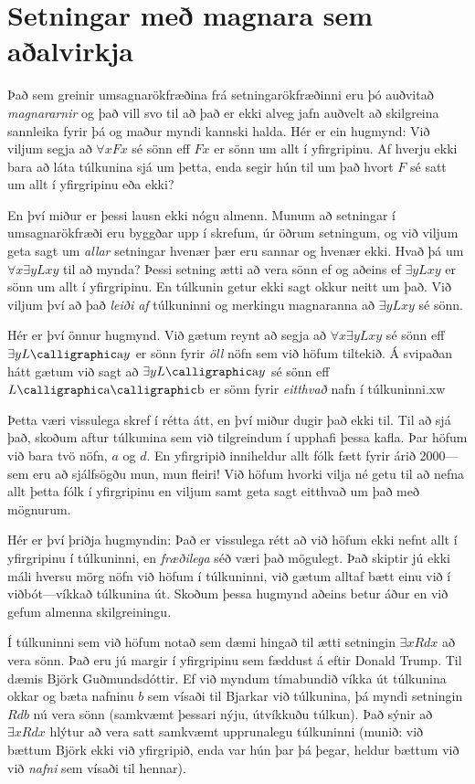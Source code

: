\section{Setningar með magnara sem aðalvirkja}\label{s:MainLogicalOperatorQuantifier}

Það sem greinir umsagnarökfræðina frá setningarökfræðinni eru þó auðvitað \emph{magnararnir} og það vill svo til að það er ekki alveg jafn auðvelt að skilgreina sannleika fyrir þá og maður myndi kannski halda. Hér er ein hugmynd: Við viljum segja að $\forall x Fx$ sé sönn eff $Fx$ er sönn um allt í yfirgripinu. Af hverju ekki bara að láta túlkunina sjá um þetta, enda segir hún til um það hvort $F$ sé satt um allt í yfirgripinu eða ekki?

En því miður er þessi lausn ekki nógu almenn. Munum að setningar í umsagnarökfræði eru byggðar upp í skrefum, úr öðrum setningum, og við viljum geta sagt um \emph{allar} setningar hvenær þær eru sannar og hvenær ekki. Hvað þá um $\forall x \exists y Lxy$ til að mynda? Þessi setning ætti að vera sönn ef og aðeins ef $\exists y Lxy$ er sönn um allt í yfirgripinu. En túlkunin getur ekki sagt okkur neitt um það. Við viljum því að það \emph{leiði af} túlkuninni og merkingu magnaranna að $\exists y Lxy$ sé sönn.

Hér er því önnur hugmynd. Við gætum reynt að segja að $\forall x \exists y Lxy$ sé sönn eff $\exists y L\meta{a}y$ er sönn fyrir \emph{öll} nöfn  sem við höfum tiltekið. Á svipaðan hátt gætum við sagt að $\exists y L\meta{a}y$ sé sönn eff $L\meta{a}\meta{b}$ er sönn fyrir \emph{eitthvað} nafn  í túlkuninni.xw

Þetta væri vissulega skref í rétta átt, en því miður dugir það ekki til. Til að sjá það, skoðum aftur túlkunina sem við tilgreindum í upphafi þessa kafla. Þar höfum við bara tvö nöfn, $a$ og $d$. En yfirgripið inniheldur allt fólk fætt fyrir árið 2000---sem eru að sjálfsögðu mun, mun fleiri! Við höfum hvorki vilja né getu til að nefna allt þetta fólk í yfirgripinu en viljum samt geta sagt eitthvað um það með mögnurum.

Hér er því þriðja hugmyndin: Það er vissulega rétt að við höfum ekki nefnt allt í yfirgripinu í túlkuninni, en \emph{fræðilega} séð væri það mögulegt. Það skiptir jú ekki máli hversu mörg nöfn við höfum í túlkuninni, við gætum alltaf bætt einu við í viðbót---víkkað túlkunina út. Skoðum þessa hugmynd aðeins betur áður en við gefum almenna skilgreiningu.

Í túlkuninni sem við höfum notað sem dæmi hingað til ætti setningin $\exists x Rdx$ að vera sönn. Það eru jú margir í yfirgripinu sem fæddust á eftir Donald Trump. Til dæmis Björk Guðmundsdóttir. Ef við myndum tímabundið víkka út túlkunina okkar og bæta nafninu $b$ sem vísaði til Bjarkar við túlkunina, þá myndi setningin $Rdb$ nú vera sönn (samkvæmt þessari nýju, útvíkkuðu túlkun). Það sýnir að $\exists x Rdx$ hlýtur að vera satt samkvæmt upprunalegu túlkuninni (munið: við bættum Björk ekki við yfirgripið, enda var hún þar þá þegar, heldur bættum við við \emph{nafni} sem vísaði til hennar).

